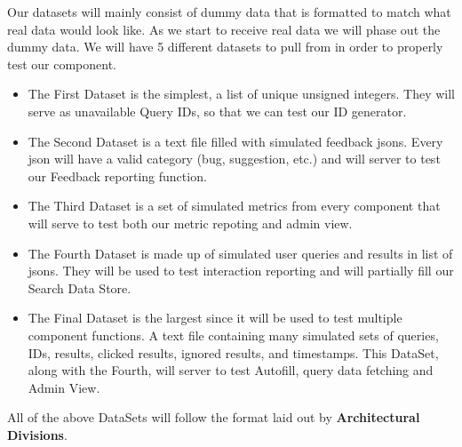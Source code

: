 Our datasets will mainly consist of dummy data that is formatted to match what real data would look like. As we start to receive real data we will phase out the dummy data. We will have 5 different datasets to pull from in order to properly test our component.
\begin{itemize}
    \item The First Dataset is the simplest, a list of unique unsigned integers. They will serve as unavailable Query IDs, so that we can test our ID generator. 
    \item The Second Dataset is a text file filled with simulated feedback jsons. Every json will have a valid category (bug, suggestion, etc.) and will server to test our Feedback reporting function.
    \item The Third Dataset is a set of simulated metrics from every component that will serve to test both our metric repoting and admin view.
    \item The Fourth Dataset is made up of simulated user queries and results in list of jsons. They will be used to test interaction reporting and will partially fill our Search Data Store. 
    \item The Final Dataset is the largest since it will be used to test multiple component functions. A text file containing many simulated sets of queries, IDs, results, clicked results, ignored results, and timestamps. This DataSet, along with the Fourth, will server to test Autofill, query data fetching and Admin View.
  \end{itemize}
All of the above DataSets will follow the format laid out by \textbf{Architectural Divisions}.